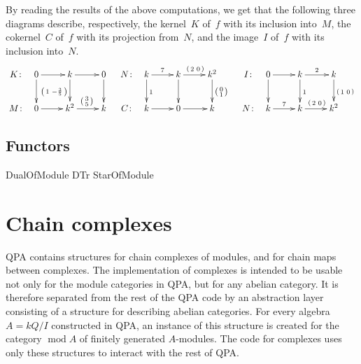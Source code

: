 \documentclass{amsart}
\renewcommand{\mod}{\operatorname{mod}\nolimits}
\theoremstyle{definition}
\newcommand{\vv}[2]{\left( \begin{smallmatrix} #1 & #2 \end{smallmatrix} \right)}
\theoremstyle{theoretic}
\begin{document}
By reading the results of the above computations, we get that the
following three diagrams describe, respectively, the kernel~$K$ of~$f$
with its inclusion into~$M$, the cokernel~$C$ of~$f$ with its projection
from~$N$, and the image~$I$ of~$f$ with its inclusion into~$N$.
\[
\xymatrix@C=.4em{
K\colon &
0 \ar[rrr]\ar[d] &&&
k \ar[rrr]\ar[d]_{\vv{1}{-\frac{3}{5}}} &&&
0 \ar[d]
\\
M\colon &
0 \ar[rrr] &&&
k^2 \ar[rrr]^{\left( \begin{smallmatrix} 3\\5 \end{smallmatrix} \right)} &&&
k
}
\quad
\xymatrix@C=.4em{
N\colon &
k \ar[rrr]^7\ar[d]^{1} &&&
k \ar[rrr]^{\vv{2}{0}}\ar[d] &&&
k^2 \ar[d]^{\left( \begin{smallmatrix} 0\\1 \end{smallmatrix} \right)}
\\
C\colon &
k \ar[rrr] &&&
0 \ar[rrr] &&&
k
}
\quad
\xymatrix@C=.4em{
I\colon &
0 \ar[rrr]\ar[d] &&&
k \ar[rrr]^2\ar[d]^1 &&&
k \ar[d]^{\vv{1}{0}}
\\
N\colon &
k \ar[rrr]^7 &&&
k \ar[rrr]^{\vv{2}{0}} &&&
k^2
}
\]


\subsection{Functors} %
DualOfModule
DTr
StarOfModule

\section{Chain complexes}%

QPA contains structures for chain complexes of modules, and for chain
maps between complexes.  The implementation of complexes is intended
to be usable not only for the module categories in QPA, but for any
abelian category.  It is therefore separated from the rest of the QPA
code by an abstraction layer consisting of a structure for describing
abelian categories.  For every algebra $A = kQ/I$ constructed in QPA,
an instance of this structure is created for the category $\mod A$ of
finitely generated $A$-modules.  The code for complexes uses only
these structures to interact with the rest of QPA.
\end{document}
